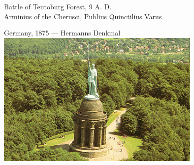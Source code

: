 \begin{frame}[t]
    \centering
    Battle of Teutoburg Forest, 9 A. D. \\
    Arminius of the Cherusci, Publius Quinctilius Varus \\
\end{frame}

\begin{frame}{Germany, 1875 --- Hermanns Denkmal}
    \centering
    \includegraphics[width=0.75\textwidth]{img/hermans-denkmal.png} \\
\end{frame}


